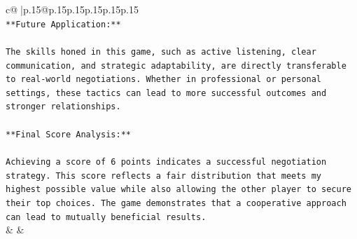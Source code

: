 \documentclass{article}
\begin{document}
{\begin{supertabular}{c@{$\;$}|p{.15\linewidth}@{}p{.15\linewidth}p{.15\linewidth}p{.15\linewidth}p{.15\linewidth}p{.15\linewidth}}
{{{\\ 
\texttt{**Future Application:**} \\
\\ 
\texttt{The skills honed in this game, such as active listening, clear communication, and strategic adaptability, are directly transferable to real{-}world negotiations. Whether in professional or personal settings, these tactics can lead to more successful outcomes and stronger relationships.} \\
\\ 
\texttt{**Final Score Analysis:**} \\
\\ 
\texttt{Achieving a score of 6 points indicates a successful negotiation strategy. This score reflects a fair distribution that meets my highest possible value while also allowing the other player to secure their top choices. The game demonstrates that a cooperative approach can lead to mutually beneficial results.} \\
            }
        }
    }
    & & \\ \\


\end{supertabular}}
\end{document}

